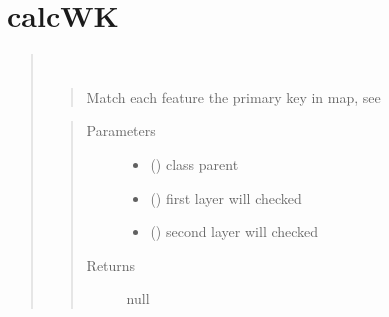 \documentclass[letterpaper,10pt,english]{sphinxmanual}
\begin{document}
\section{calcWK}
\label{\detokenize{similarity_method:calcwk}}\begin{quote}

\begin{fulllineitems}
\label{\detokenize{similarity_method:calcWK}}~\begin{quote}

Match each feature the primary key in map, see 
\end{quote}
\begin{quote}\begin{description}
\item[{Parameters}] \leavevmode\begin{itemize}
\item {} 
 () \textendash{} class parent

\item {} 
 () \textendash{} first layer will checked

\item {} 
 () \textendash{} second layer will checked

\end{itemize}

\item[{Returns}] \leavevmode
null

\end{description}\end{quote}

\end{fulllineitems}

\end{quote}
\end{document}
